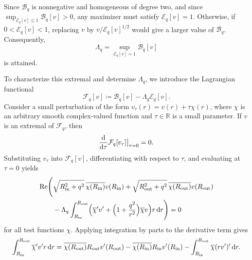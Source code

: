 \documentclass[12pt,reqno]{amsart}
\numberwithin{equation}{section}
\begin{document}
Since \(\mathcal B_q\) is nonnegative and homogeneous of degree two, and since
\(\sup_{\mathcal E_q[v]\leq 1}\mathcal B_q[v]>0\), any maximizer must satisfy
\(\mathcal E_q[v]=1\). Otherwise, if \(0<\mathcal E_q[v]<1\), replacing \(v\)
by \(v/\mathcal E_q[v]^{1/2}\) would give a larger value of \(\mathcal B_q\).
Consequently,
\[
\Lambda_q
=
\sup_{\mathcal E_q[v]=1}\mathcal B_q[v]
\]
is attained.


















To characterize this extremal and determine $\Lambda_q$, we introduce the Lagrangian functional
\begin{equation*}
    \mathcal{F}_q[v] \coloneqq \mathcal{B}_q[v] - \Lambda_q \mathcal{E}_q[v].
\end{equation*}
Consider a small perturbation of the form $v_\tau(r) = v(r) + \tau \chi(r)$, where $\chi$ is an arbitrary smooth complex-valued function and $\tau \in \mathbb{R}$ is a small parameter. If $v$ is an extremal of $\mathcal{F}_q$, then
\[
\frac{{\rm d}}{{\rm d}\tau} \mathcal{F}_q[v_\tau] \big|_{\tau=0} = 0.
\]
Substituting $v_\tau$ into $\mathcal{F}_q[v]$, differentiating with respect to $\tau$, and evaluating at $\tau=0$ yields
\begin{equation}\label{eq55}
\begin{aligned}
    \operatorname{Re} \Biggl( &\sqrt{R_{\mathrm{in}}^2 + q^2} \, \overline{\chi(R_{\mathrm{in}})} v(R_{\mathrm{in}}) 
    + \sqrt{R_{\mathrm{out}}^2 + q^2} \, \overline{\chi(R_{\mathrm{out}})} v(R_{\mathrm{out}}) \\
    &- \Lambda_q \int_{R_{\mathrm{in}}}^{R_{\mathrm{out}}} \Bigl( \overline{\chi}' v' + \Bigl(1 + \frac{q^2}{r^2}\Bigr) \overline{\chi} v \Bigr) r \, {\rm d}r \Biggr) = 0
\end{aligned}
\end{equation}
for all test functions $\chi$. Applying integration by parts to the derivative term gives
\begin{equation}\label{eq56}
    \int_{R_{\mathrm{in}}}^{R_{\mathrm{out}}} \overline{\chi}' v' r \, {\rm d}r
    = \overline{\chi(R_{\mathrm{out}})} R_{\mathrm{out}} v'(R_{\mathrm{out}}) - \overline{\chi(R_{\mathrm{in}})} R_{\mathrm{in}} v'(R_{\mathrm{in}})
    - \int_{R_{\mathrm{in}}}^{R_{\mathrm{out}}} \overline{\chi} (r v')' \, {\rm d}r.
\end{equation}
\end{document}
